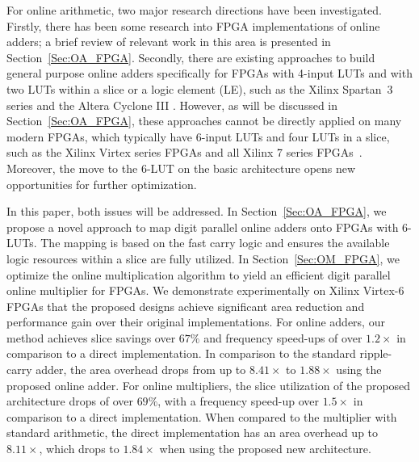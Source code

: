 \documentclass[conference]{IEEEtran}
\begin{document}
For online arithmetic, two major research directions have been investigated. Firstly, there has been some research into FPGA implementations of online adders; a brief review of relevant work in this area is presented in Section~\ref{Sec:OA_FPGA}. Secondly, there are existing approaches to build general purpose online adders specifically for FPGAs with 4-input LUTs and with two LUTs within a slice or a logic element (LE), such as the Xilinx Spartan~3 series \cite{XilinxSpartan} and the Altera Cyclone III \cite{AlteraCyclone}. However, as will be discussed in Section~\ref{Sec:OA_FPGA}, these approaches cannot be directly applied on many modern FPGAs, which typically have 6-input LUTs and four LUTs in a slice, such as the Xilinx Virtex series FPGAs and all Xilinx 7 series FPGAs~\cite{Virtex7}. Moreover, the move to the 6-LUT on the basic architecture opens new opportunities for further optimization.

In this paper, both issues will be addressed. In Section~\ref{Sec:OA_FPGA}, we propose a novel approach to map digit parallel online adders onto FPGAs with 6-LUTs. The mapping is based on the fast carry logic and ensures the available logic resources within a slice are fully utilized. In Section~\ref{Sec:OM_FPGA}, we optimize the online multiplication algorithm to yield an efficient digit parallel online multiplier for FPGAs. We demonstrate experimentally on Xilinx Virtex-6 FPGAs that the proposed designs achieve significant area reduction and performance gain over their original implementations. For online adders, our method achieves  slice savings over $67\%$ and  frequency speed-ups of over $1.2\times$ in comparison to a direct implementation. In comparison to the standard ripple-carry adder, the area overhead drops from up to $8.41\times$ to $1.88\times$ using the proposed online adder. For online multipliers, the slice utilization of the proposed architecture drops of over $69\%$, with a frequency speed-up over $1.5\times$ in comparison to a direct implementation. When compared to the multiplier with standard arithmetic, the direct implementation has an area overhead up to $8.11\times$, which drops to $1.84\times$ when using the proposed new architecture.
\end{document}
